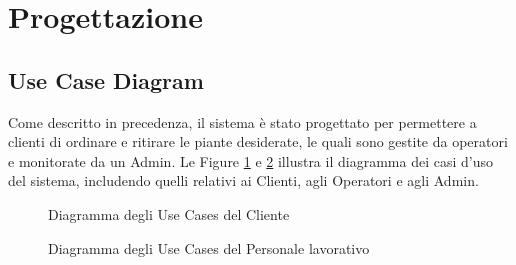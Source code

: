 \documentclass{article}
\begin{document}
\section{Progettazione}

\subsection{Use Case Diagram}
Come descritto in precedenza, il sistema è stato progettato per permettere a clienti di ordinare e ritirare le piante desiderate, le quali sono gestite da operatori e monitorate da un Admin. Le Figure \ref{fig:diagram_usecases_client} e \ref{fig:diagram_usecases_worker} illustra il diagramma dei casi d'uso del sistema, includendo quelli relativi ai Clienti, agli Operatori e agli Admin.
\\



\begin{figure}[H]
    \centering
    \caption{Diagramma degli Use Cases del Cliente}
    \label{fig:diagram_usecases_client}
\end{figure}
\begin{figure}[H]
    \centering
    \caption{Diagramma degli Use Cases del Personale lavorativo}
    \label{fig:diagram_usecases_worker}
\end{figure}
\end{document}
